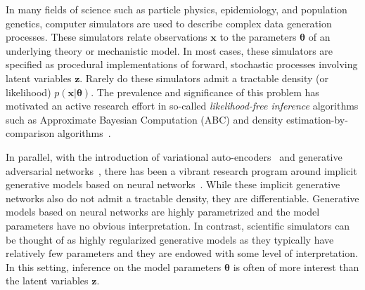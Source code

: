 \documentclass[twocolumn,superscriptaddress,aps]{revtex4-1}
\newcommand{\kcnote}[1]{\textcolor{red}{[KC: #1]}}
\newcommand{\bftheta}{{\bm \theta}}
\newcommand{\bfx}{\mathbf{x}}
\newcommand{\bfz}{\mathbf{z}}
\theoremstyle{plain}
\begin{document}
In many fields of science such as particle physics, epidemiology,  and population
genetics, computer simulators are used to describe complex data generation processes. These simulators relate
observations $\bfx$ to the parameters $\bftheta$ of an underlying theory or mechanistic model.
In most cases, these simulators are specified as procedural implementations of forward, stochastic processes involving latent variables $\bfz$.
Rarely do these simulators admit a tractable density (or likelihood) $p(\bfx |
\bftheta)$. The prevalence and significance of this problem has motivated an
active research effort in so-called \textit{likelihood-free inference}
algorithms such as Approximate Bayesian Computation
(ABC) and density estimation-by-comparison algorithms~\cite{beaumont2002approximate, marjoram2003markov, sisson2007sequential,
sisson2011likelihood, marin2012approximate, cranmer2015approximating}.




In parallel, with the introduction of variational
auto-encoders~\citep{DBLP:journals/corr/KingmaW13} and generative adversarial
networks~\cite{goodfellow2014generative}, there has been a vibrant research
program around implicit generative models based on neural
networks~\citep{2016arXiv161003483M}.  While these implicit generative networks
also do not admit a tractable density, they are differentiable.
Generative models based on neural networks are highly parametrized and the model
parameters have no obvious interpretation. In contrast, scientific simulators
can be thought of as highly regularized generative models as they typically have
relatively few parameters and they are endowed with some level of
interpretation. In this setting, inference on the model parameters $\bftheta$ is
often of more interest than the latent variables $\bfz$.
\end{document}
